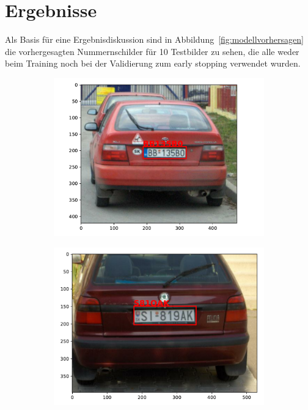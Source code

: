 \section{Ergebnisse}
\label{sec:ergebnisse}

Als Basis f\"ur eine Ergebnisdiskussion sind in
Abbildung~\ref{fig:modellvorhersagen} die vorhergesagten Nummernschilder
f\"ur 10 Testbilder zu sehen, die alle weder beim Training noch bei der
Validierung zum early stopping verwendet wurden.

\begin{figure}
    \centering
    \begin{subfigure}{0.31\textwidth}
        \includegraphics[width=\textwidth]{abbildungen/prediction_01.pdf}
    \end{subfigure}
    \begin{subfigure}{0.31\textwidth}
        \includegraphics[width=\textwidth]{abbildungen/prediction_02.pdf}

\end{subfigure}
\end{figure}
